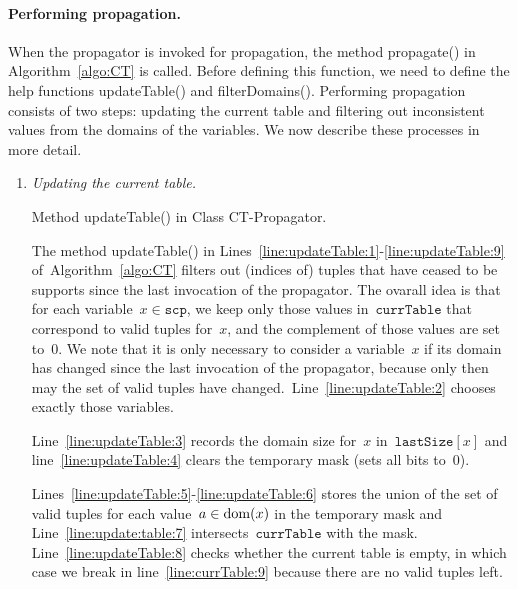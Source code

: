 \documentclass[a4paper,11pt]{article}
\newcommand{\Algoref}[1]{Algorithm~\ref{#1}}
\newcommand{\Lineref}[1]{Line~\ref{#1}}
\newcommand{\Linesref}[2]{Lines~\ref{#1}-\ref{#2}}
\newcommand{\Scp}{\texttt{scp}}
\newcommand{\CurrTable}{\texttt{currTable}}
\newcommand{\LastSizes}{\texttt{lastSize}}
\numberwithin{equation}{section}
\begin{document}
\paragraph{Performing propagation.}
When the propagator is invoked for propagation, the method propagate()
in \Algoref{algo:CT} is called. Before defining this function, we need
to define the help functions updateTable() and filterDomains().
Performing propagation consists of two steps: updating the current
table and filtering out inconsistent values from the domains of the variables.
We now describe these processes in more detail.

\begin{enumerate}
\item \textit{Updating the current table.} 
  
  \begin{algorithm}[H]
  \begin{algorithmic}[1]  %
    
  \end{algorithmic}
  \caption{Method updateTable() in Class CT-Propagator.}
  \label{algo:updateTable}
\end{algorithm}

  The method updateTable() in 
  \Linesref{line:updateTable:1}{line:updateTable:9} of~\Algoref{algo:CT}
  filters out (indices of)
  tuples that have ceased to be supports since the last invocation of the
  propagator. The ovarall idea is that for each variable~$x \in \Scp$, we keep 
  only those values in~$\CurrTable$ that correspond to valid tuples for~$x$, and the
  complement of those values are set to~$0$. We note that
  it is only necessary to consider a variable~$x$ if its domain has changed
  since the last invocation of the propagator, because only then
  may the set of valid tuples have changed.~\Lineref{line:updateTable:2}
  chooses exactly those variables.

  \Lineref{line:updateTable:3} records the domain size for~$x$ in~$\LastSizes[x]$
  and line~\ref{line:updateTable:4} clears the temporary mask (sets all bits to~$0$).

  \Linesref{line:updateTable:5}{line:updateTable:6} stores the union of the
  set of valid tuples for each value~$a \in \text{dom}(x)$ in the temporary mask
  and \Lineref{line:update:table:7} intersects~$\CurrTable$ with the mask.
  \Lineref{line:updateTable:8} checks whether the current table is empty,
  in which case we break in line~\ref{line:currTable:9}
  because there are no valid tuples left.


\end{enumerate}
\end{document}

